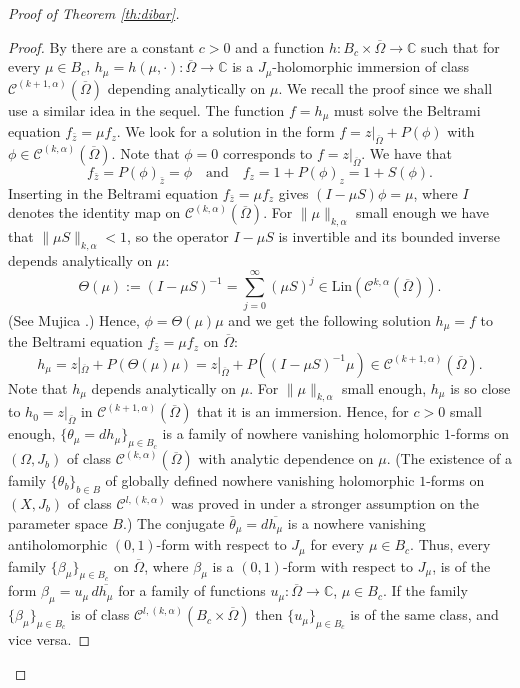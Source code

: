 \documentclass[11pt]{amsart}
\numberwithin{equation}{section}
\theoremstyle{definition}
\newcommand\Cscr{\mathscr{C}}
\newcommand\C{\mathbb{C}}
\begin{document}
\begin{proof}[Proof of Theorem \ref{th:dibar}]
\begin{proof}
By \cite[Theorem 4.1]{Forstneric2024Runge} there are a constant 
$c>0$ and a function $h:B_c \times \overline \Omega\to \C$ such that
for every $\mu\in B_c$, $h_\mu=h(\mu,\cdotp):\overline \Omega\to\C$ 
is a $J_\mu$-holomorphic immersion of class 
$\Cscr^{(k+1,\alpha)}(\overline \Omega)$ depending analytically on $\mu$.
We recall the proof since we shall use a similar idea 
in the sequel. The function $f=h_\mu$ must solve 
the Beltrami equation $f_{\bar z} = \mu f_z$.
We look for a solution in the form $f=z|_{\overline \Omega} +P(\phi)$ with
$\phi\in \Cscr^{(k,\alpha)}(\overline \Omega)$.
Note that $\phi=0$ corresponds to $f=z|_{\overline\Omega}$. 
We have that 
\[
	f_{\bar z}= P(\phi)_{\bar z}  = \phi
	\quad \text{and} \quad 
	f_z = 1 + P(\phi)_z = 1+ S(\phi).
\]
Inserting in the Beltrami equation $f_{\bar z} = \mu f_z$ gives $(I - \mu S) \phi =\mu$,
where $I$ denotes the identity map on $\Cscr^{(k,\alpha)}(\overline\Omega)$. 
For $\|\mu\|_{k,\alpha}$ small enough we have that $\|\mu S\|_{k,\alpha}<1$, 
so the operator $I- \mu S$ is invertible and its bounded inverse  
depends analytically on $\mu$: 
\[ 
	\Theta(\mu) := (I - \mu S)^{-1} =
	\sum_{j=0}^\infty (\mu S)^j 
	\in  \mathrm{Lin}(\Cscr^{k,\alpha}(\overline\Omega)). 
\] 
(See Mujica \cite[29.3 Theorem]{Mujica1986}.)
Hence, $\phi=\Theta(\mu)\mu$ and we get 
the following solution $h_\mu=f$ to the 
Beltrami equation $f_{\bar z} = \mu f_z$ on $\overline\Omega$:
\[ 
	h_\mu = z|_{\overline\Omega} +  P (\Theta(\mu) \mu) 
	= z|_{\overline\Omega} + P((I - \mu S)^{-1} \mu)
	 \in \Cscr^{(k+1,\alpha)}(\overline\Omega).
\] 
Note that $h_\mu$ depends analytically on $\mu$. For $\|\mu\|_{k,\alpha}$ 
small enough, $h_\mu$ is so close to $h_0=z|_{\overline\Omega}$ in
$\Cscr^{(k+1,\alpha)}(\overline\Omega)$ that it is an immersion.
Hence, for $c>0$ small enough, 
$\{\theta_\mu=dh_\mu\}_{\mu\in B_c}$
is a family of nowhere vanishing holomorphic 
$1$-forms on $(\Omega,J_b)$ of class 
$\Cscr^{(k,\alpha)}(\overline\Omega)$ with analytic dependence on $\mu$. 
(The existence of a family $\{\theta_b\}_{b\in B}$ of globally defined nowhere vanishing holomorphic $1$-forms on $(X,J_b)$ of class $\Cscr^{l,(k,\alpha)}$ was proved in \cite[Theorem 7.1]{Forstneric2024Runge} under a stronger assumption on the parameter space $B$.) 
%
The conjugate $\bar \theta_\mu=d\overline{h_\mu}$ is a nowhere vanishing 
antiholomorphic $(0,1)$-form with respect to $J_\mu$ for every 
$\mu\in B_c$. Thus, every family $\{\beta_\mu\}_{\mu\in B_c}$ 
on $\overline\Omega$, where $\beta_\mu$ is a $(0,1)$-form 
with respect to $J_\mu$, is of the form 
$\beta_\mu=u_{\mu}\, d\overline{h_\mu}$ for a family of functions 
$u_\mu: \overline\Omega\to \C$, $\mu\in B_c$. If the family 
$\{\beta_\mu\}_{\mu\in B_c}$ is of class 
$\Cscr^{l,(k,\alpha)}(B_c\times\overline\Omega)$
then $\{u_\mu\}_{\mu\in B_c}$ is of the same class, and vice versa.


\end{proof}
\end{proof}
\end{document}
